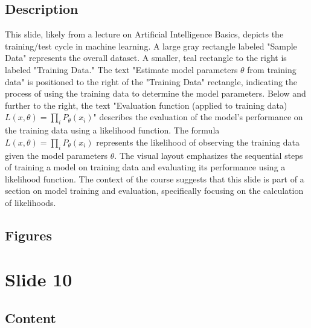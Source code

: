\documentclass{article}%
\begin{document}
\subsection{Description}%
This slide, likely from a lecture on Artificial Intelligence Basics, depicts the training/test cycle in machine learning.  A large gray rectangle labeled "Sample Data" represents the overall dataset.  A smaller, teal rectangle to the right is labeled "Training Data."  The text "Estimate model parameters $\theta$ from training data" is positioned to the right of the "Training Data" rectangle, indicating the process of using the training data to determine the model parameters.  Below and further to the right, the text "Evaluation function (applied to training data) $L(x, \theta) = \prod_{i} P_{\theta}(x_i)$" describes the evaluation of the model's performance on the training data using a likelihood function.  The formula $L(x, \theta) = \prod_{i} P_{\theta}(x_i)$ represents the likelihood of observing the training data given the model parameters $\theta$.  The visual layout emphasizes the sequential steps of training a model on training data and evaluating its performance using a likelihood function. The context of the course suggests that this slide is part of a section on model training and evaluation, specifically focusing on the calculation of likelihoods.%
\subsection{Figures}%
\begin{figure}[H]%
\centering%
\end{figure}

%
\newpage%
\section{Slide 10}%
\label{sec:Slide10}%
\subsection{Content}%
%
\end{document}
